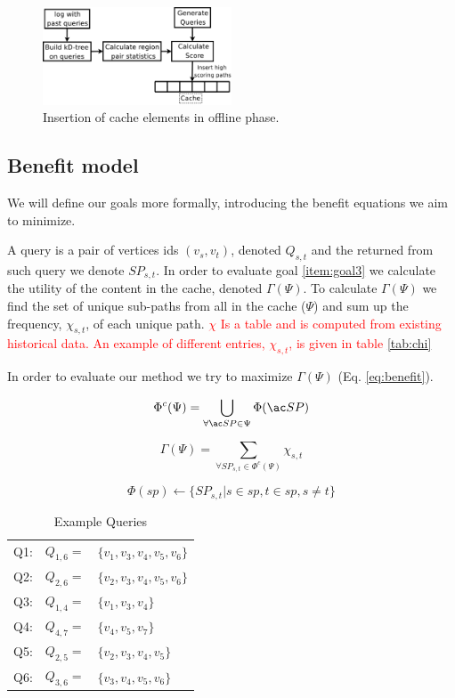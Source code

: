 \begin{figure}[bht]
  \center
        \includegraphics[width=0.5\textwidth]{figures/fillcache}
        \caption{Insertion of cache elements in offline phase.}
  \label{fig:fillcache}
\end{figure}


\subsection{Benefit model}

We will define our goals more formally, introducing the benefit equations we aim to minimize.

A query is a pair of vertices ids $(v_s, v_t)$, denoted $Q_{s,t}$ and the \spath returned from such query we denote $SP_{s,t}$. 
In order to evaluate goal \ref{item:goal3} we calculate the utility of the content in the cache, denoted $\Gamma(\Psi)$. To calculate $\Gamma(\Psi)$ we find the set of unique sub-paths from all \spaths in the cache ($\Psi$) and sum up the frequency, $\chi_{s,t}$, of each unique path.
\textcolor{red}{$\chi$ Is a table and is computed from existing historical data. An example of different entries, $\chi_{s,t}$, is given in table \ref{tab:chi}}

In order to evaluate our method we try to maximize $\Gamma(\Psi)$ (Eq. \ref{eq:benefit}).


\begin{equation} \label{eq:upsi}
 \Phi^c(\Psi) = \bigcup\limits_{\forall \spath \in \Psi} \Phi(\spath)
\end{equation}

\begin{equation} \label{eq:benefit}
\Gamma(\Psi) = \sum\limits_{\forall SP_{s,t} \in \Phi^c(\Psi)} \chi_{s,t}
\end{equation}

\begin{equation} \label{eq:phi}
\Phi(sp) \leftarrow \{ SP_{s,t} | s \in sp, t \in sp, s \neq t\}
\end{equation}


\begin{table}
\begin{tabular}{l l p{}}
Q1:	&	$Q_{1,6} =$ 	& $\{v_1,v_3,v_4,v_5,v_6\}$\\
Q2:	&	$Q_{2,6} =$ 	& $\{v_2,v_3,v_4,v_5,v_6\}$ \\
Q3:	&	$Q_{1,4} =$ 	& $\{v_1,v_3,v_4\}$ \\
Q4:	&	$Q_{4,7} =$ 	& $\{v_4,v_5,v_7\}$ \\
Q5:	&	$Q_{2,5} =$ 	& $\{v_2,v_3,v_4,v_5\}$ \\
Q6:	&	$Q_{3,6} =$ 	& $\{v_3,v_4,v_5,v_6\}$ \\
\end{tabular}
\caption{Example Queries}
\label{tab:queries}
\end{table}

